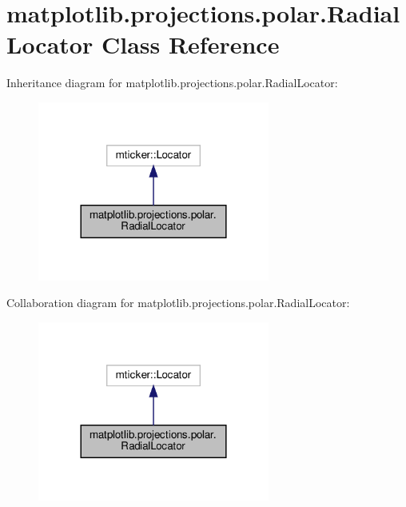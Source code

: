 \hypertarget{classmatplotlib_1_1projections_1_1polar_1_1RadialLocator}{}\section{matplotlib.\+projections.\+polar.\+Radial\+Locator Class Reference}
\label{classmatplotlib_1_1projections_1_1polar_1_1RadialLocator}


Inheritance diagram for matplotlib.\+projections.\+polar.\+Radial\+Locator\+:
\nopagebreak
\begin{figure}[H]
\begin{center}
\leavevmode
\includegraphics[width=216pt]{classmatplotlib_1_1projections_1_1polar_1_1RadialLocator__inherit__graph}
\end{center}
\end{figure}


Collaboration diagram for matplotlib.\+projections.\+polar.\+Radial\+Locator\+:
\nopagebreak
\begin{figure}[H]
\begin{center}
\leavevmode
\includegraphics[width=216pt]{classmatplotlib_1_1projections_1_1polar_1_1RadialLocator__coll__graph}
\end{center}
\end{figure}
